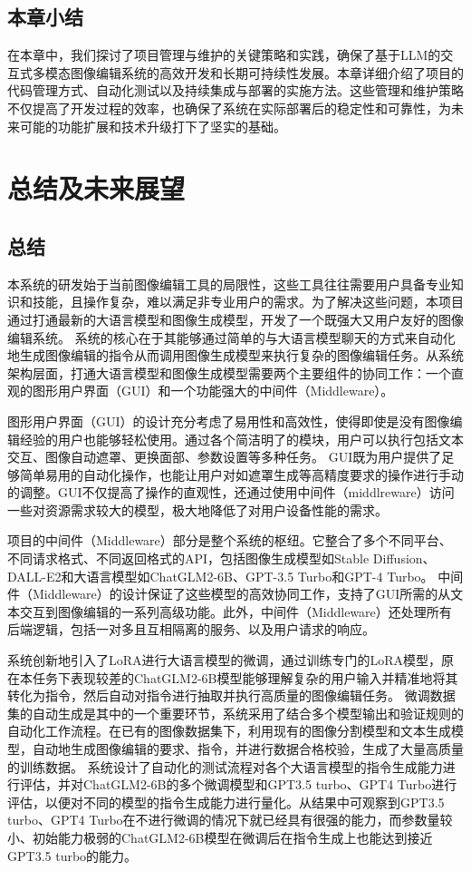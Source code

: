 \documentclass[a4paper,AutoFakeBold,oneside,12pt]{book}
\begin{document}
\section{本章小结}
在本章中，我们探讨了项目管理与维护的关键策略和实践，确保了基于LLM的交互式多模态图像编辑系统的高效开发和长期可持续性发展。本章详细介绍了项目的代码管理方式、自动化测试以及持续集成与部署的实施方法。这些管理和维护策略不仅提高了开发过程的效率，也确保了系统在实际部署后的稳定性和可靠性，为未来可能的功能扩展和技术升级打下了坚实的基础。

\chapter{总结及未来展望} %
\section{总结}
本系统的研发始于当前图像编辑工具的局限性，这些工具往往需要用户具备专业知识和技能，且操作复杂，难以满足非专业用户的需求。为了解决这些问题，本项目通过打通最新的大语言模型和图像生成模型，开发了一个既强大又用户友好的图像编辑系统。
系统的核心在于其能够通过简单的与大语言模型聊天的方式来自动化地生成图像编辑的指令从而调用图像生成模型来执行复杂的图像编辑任务。从系统架构层面，打通大语言模型和图像生成模型需要两个主要组件的协同工作：一个直观的图形用户界面（GUI）和一个功能强大的中间件（Middleware）。

图形用户界面（GUI）的设计充分考虑了易用性和高效性，使得即使是没有图像编辑经验的用户也能够轻松使用。通过各个简洁明了的模块，用户可以执行包括文本交互、图像自动遮罩、更换面部、参数设置等多种任务。
GUI既为用户提供了足够简单易用的自动化操作，也能让用户对如遮罩生成等高精度要求的操作进行手动的调整。GUI不仅提高了操作的直观性，还通过使用中间件（middlreware）访问一些对资源需求较大的模型，极大地降低了对用户设备性能的需求。

项目的中间件（Middleware）部分是整个系统的枢纽。它整合了多个不同平台、不同请求格式、不同返回格式的API，包括图像生成模型如Stable Diffusion、DALL-E2和大语言模型如ChatGLM2-6B、GPT-3.5 Turbo和GPT-4 Turbo。
中间件（Middleware）的设计保证了这些模型的高效协同工作，支持了GUI所需的从文本交互到图像编辑的一系列高级功能。此外，中间件（Middleware）还处理所有后端逻辑，包括一对多且互相隔离的服务、以及用户请求的响应。

系统创新地引入了LoRA进行大语言模型的微调，通过训练专门的LoRA模型，原在本任务下表现较差的ChatGLM2-6B模型能够理解复杂的用户输入并精准地将其转化为指令，然后自动对指令进行抽取并执行高质量的图像编辑任务。
微调数据集的自动生成是其中的一个重要环节，系统采用了结合多个模型输出和验证规则的自动化工作流程。在已有的图像数据集下，利用现有的图像分割模型和文本生成模型，自动地生成图像编辑的要求、指令，并进行数据合格校验，生成了大量高质量的训练数据。
系统设计了自动化的测试流程对各个大语言模型的指令生成能力进行评估，并对ChatGLM2-6B的多个微调模型和GPT3.5 turbo、GPT4 Turbo进行评估，以便对不同的模型的指令生成能力进行量化。从结果中可观察到GPT3.5 turbo、GPT4 Turbo在不进行微调的情况下就已经具有很强的能力，而参数量较小、初始能力极弱的ChatGLM2-6B模型在微调后在指令生成上也能达到接近GPT3.5 turbo的能力。
\end{document}
